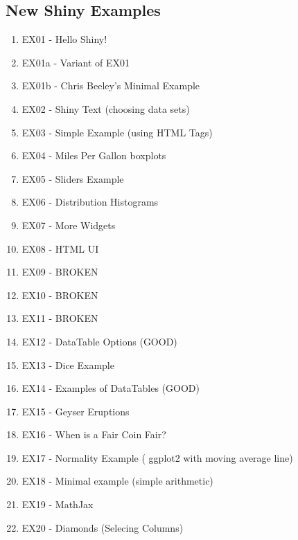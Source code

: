 \documentclass[a4paper,12pt]{article}
\begin{document}
\subsection*{New Shiny Examples}

\begin{enumerate}
\item EX01 - Hello Shiny!
\item EX01a - Variant of EX01
\item EX01b - Chris Beeley's Minimal Example
\item EX02 - Shiny Text (choosing data sets)
\item EX03 - Simple Example (using HTML Tags)
\item EX04 - Miles Per Gallon boxplots
\item EX05 - Sliders Example
\item EX06 - Distribution Histograms
\item EX07 - More Widgets
\item EX08 - HTML UI
\item EX09 - BROKEN
\item EX10 - BROKEN
\item EX11 - BROKEN
\item EX12 - DataTable Options (GOOD)
\item EX13 - Dice Example
\item EX14 - Examples of DataTables (GOOD)
\item EX15 - Geyser Eruptions
\item EX16 - When is a Fair Coin Fair?
\item EX17 - Normality Example ( ggplot2 with moving average line)
\item EX18 - Minimal example  (simple arithmetic)
\item EX19 - MathJax
\item EX20 - Diamonds (Selecing Columns)
\end{enumerate}
\end{document}
